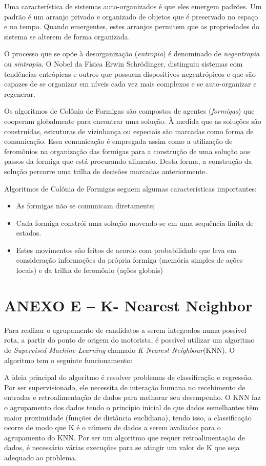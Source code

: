 Uma característica de sistemas auto-organizados é que eles emergem padrões. Um padrão é um arranjo privado e organizado de objetos que é preservado no espaço e no tempo. Quando emergentes, estes arranjos permitem que as propriedades do sistema se alterem de forma organizada.

O processo que se opõe à desorganização (\emph{entropia}) é denominado de \emph{negentropia} ou \emph{sintropia}. O Nobel da Física Erwin Schrödinger, distinguiu sistemas com tendências entrópicas e outros que possuem dispositivos negentrópicos e que são capazes de se organizar em níveis cada vez mais complexos e se auto-organizar e regenerar. 

Os algoritmos de Colônia de Formigas são compostos de agentes (\emph{formigas}) que cooperam globalmente para encontrar uma solução. À medida que as soluções são construídas, estruturas de vizinhança ou especiais são marcadas como forma de comunicação. Essa comunicação é empregada assim como a utilização de feromônios na organização das formigas para a construção de uma solução aos passos da formiga que está procurando alimento. Desta forma, a construção da solução percorre uma trilha de decisões marcadas anteriormente.

Algoritmos de Colônia de Formigas seguem algumas características importantes:
\begin{itemize}
    \item As formigas não se comunicam diretamente;
    \item Cada formiga constrói uma solução movendo-se em uma sequência finita de estados.
    \item Estes movimentos são feitos de acordo com probabilidade que leva em consideração informações da própria formiga (memória simples de ações locais) e da trilha de feromônio (ações globais)
\end{itemize}

\chapter*{ANEXO E -- K- Nearest Neighbor}
\label{anexo-k-nearest}
Para realizar o agrupamento de candidatos a serem integrados numa possível rota, a partir do ponto de origem do motorista, é possível utilizar um algoritmo de \emph{ Supervised Machine-Learning }chamado \emph{K-Nearest Neighbour}(KNN). O algoritmo tem o seguinte funcionamento:

A ideia principal do algoritmo é resolver problemas de classificação e regressão. Por ser supervisionado, ele necessita de interação humana no recebimento de entradas e retroalimentação de dados para melhorar seu desempenho. O KNN faz o agrupamento dos dados tendo o princípio inicial de que dados semelhantes têm maior proximidade (funções de distância euclidiana), tendo isso, a classificação ocorre de modo que K é o número de dados a serem avaliados para o agrupamento do KNN. Por ser um algoritmo que requer retroalimentação de dados, é necessário várias execuções para se atingir um valor de K que seja adequado ao problema.

